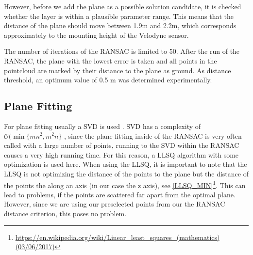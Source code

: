 \documentclass[11pt,oneside,openright]{mpreport}
\begin{document}
However, before we add the plane as a possible solution candidate, it is checked whether the layer is within a plausible parameter range.
This means that the distance of the plane should move between 1.9m and 2.2m, which corresponds approximately to the mounting height of the Velodyne sensor.

The number of iterations of the \ac{RANSAC} is limited to 50. After the run of the \ac{RANSAC}, the plane with the lowest error is taken and all points in the
pointcloud are marked by their distance to the plane as ground. As distance threshold, an optimum value of 0.5 m was determined experimentally.


\subsection{Plane Fitting}
\label{subssec:planefitting}



For plane fitting usually a \ac{SVD} is used \cite{Nurunnabi2012,Ram2007,Soderkvist2009}. SVD has a complexity of $\mathcal{O}(\min\{mn^2, m^2n\}$ \cite{Holmes2007}, since the plane fitting inside
of the \ac{RANSAC} is very often called with a large number of points, running to the \ac{SVD} within the \ac{RANSAC} causes a very high running time.
For this reason, a \ac{LLSQ} algorithm with some optimization is used here.
When using the \ac{LLSQ}, it is important to note that the \ac{LLSQ} is not optimizing the distance of the points to the plane but the distance of the points the along an axis (in our case the z axis),
see \cref{LLSQ_MIN}\footnote{\url{https://en.wikipedia.org/wiki/Linear_least_squares_(mathematics) (03/06/2017)}}. This can lead to problems, if the points are scattered far apart from the optimal plane. However, since we are using our preselected points from our the \ac{RANSAC}
distance criterion, this poses no problem.
\end{document}
